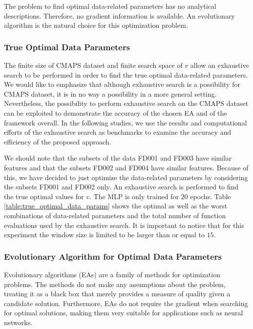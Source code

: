 \documentclass[12pt]{IEEEtran}%
\begin{document}
The problem to find optimal data-related parameters has no analytical
descriptions. Therefore, no gradient information is available. An evolutionary
algorithm is the natural choice for this optimization problem.

\subsubsection{True Optimal Data Parameters}

The finite size of CMAPS dataset and finite search space 
of $v$ allow an exhaustive
search to be performed in order to find the true optimal data-related
parameters. We would like to emphasize that although exhaustive search is a
possibility for CMAPS dataset, it is in no way a possibility in a more general
setting. Nevertheless, the possibility to perform exhaustive search on the
CMAPS dataset can be exploited to demonstrate the accuracy of the chosen EA
and of the framework overall. In the following studies, we use the results and
computational efforts of the exhaustive search as benchmarks to examine the
accuracy and efficiency of the proposed approach.

We should note that the subsets of the data FD001 and FD003 have similar
features and that the subsets FD002 and FD004 have similar features. Because
of this, we have decided to just optimize the data-related parameters by
considering the subsets FD001 and FD002 only. An exhaustive search is
performed to find the true optimal values for $v$. 
The MLP is only trained for $20$ epochs. Table
\ref{table:true_optimal_data_params} shows the optimal as well as the worst
combinations of data-related parameters and the total number of function
evaluations used by the exhaustive search. It is important to notice that for 
this experiment the window size is limited to be larger than or equal to $15$.

\subsubsection{Evolutionary Algorithm for Optimal Data Parameters}

\label{sec:ea_optimization_process}

Evolutionary algorithms (EAs) are a family of methods for optimization
problems. The methods do not make any assumptions about the problem, treating
it as a black box that merely provides a measure of quality given a candidate
solution. Furthermore, EAs do not require the gradient when searching for
optimal solutions, making them very suitable for applications such as neural networks.
\end{document}
